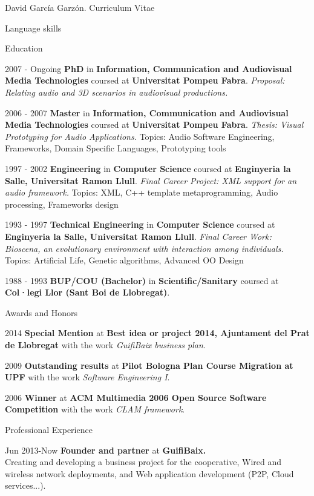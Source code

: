 \documentclass{article}
\begin{document}
\begin{cv}{David García Garzón. Curriculum Vitae}
\begin{cvlist}{Language skills}
\end{cvlist}


\begin{cvlist}{Education}

\item[2007 - Ongoing]
{\bf PhD} in {\bf Information, Communication and Audiovisual Media Technologies}
coursed at {\bf Universitat Pompeu Fabra}.
{\em Proposal: Relating audio and 3D scenarios in audiovisual productions.}
\item[2006 - 2007]
{\bf Master} in {\bf Information, Communication and Audiovisual Media Technologies}
coursed at {\bf Universitat Pompeu Fabra}.
{\em Thesis: Visual Prototyping for Audio Applications.}
Topics: Audio Software Engineering, Frameworks, Domain Specific Languages, Prototyping tools
\item[1997 - 2002]
{\bf Engineering} in {\bf Computer Science}
coursed at {\bf Enginyeria la Salle, Universitat Ramon Llull}.
{\em Final Career Project: XML support for an audio framework.}
Topics: XML, C++ template metaprogramming, Audio processing, Frameworks design
\item[1993 - 1997]
{\bf Technical Engineering} in {\bf Computer Science}
coursed at {\bf Enginyeria la Salle, Universitat Ramon Llull}.
{\em Final Career Work: Bioscena, an evolutionary environment with interaction among individuals.}
Topics: Artificial Life, Genetic algorithms, Advanced OO Design
\item[1988 - 1993]
{\bf BUP/COU (Bachelor)} in {\bf Scientific/Sanitary}
coursed at {\bf Col·legi Llor (Sant Boi de Llobregat)}.
{\em }
\end{cvlist}

\begin{cvlist}{Awards and Honors}

\item[2014]
{\bf Special Mention}
at {\bf Best idea or project 2014, Ajuntament del Prat de Llobregat}
with the work {\em GuifiBaix business plan}.
\item[2009]
{\bf Outstanding results}
at {\bf Pilot Bologna Plan Course Migration at UPF}
with the work {\em Software Engineering I}.
\item[2006]
{\bf Winner}
at {\bf ACM Multimedia 2006 Open Source Software Competition}
with the work {\em CLAM framework}.
\end{cvlist}

\begin{cvlist}{Professional Experience}

\item[Jun 2013-Now]
{\bf Founder and partner} at
{\bf GuifiBaix.}\\
Creating and developing a business project for the cooperative, Wired and wireless network deployments, and Web application development (P2P, Cloud services...).


\end{cvlist}
\end{cv}
\end{document}
